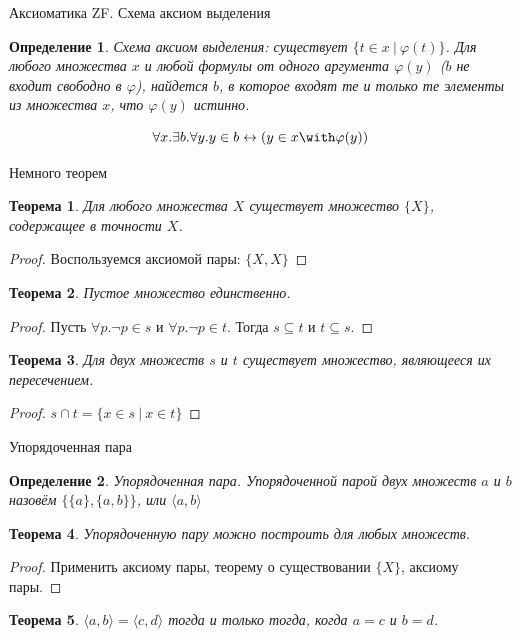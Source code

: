 \documentclass[aspectratio=169]{beamer}
\newtheorem{thm}{Теорема}[section]
\newtheorem{dfn}{Определение}[section]
\begin{document}
\begin{frame}{Аксиоматика ZF. Схема аксиом выделения}
\begin{dfn} Схема аксиом выделения: существует $\{ t \in x\ |\ \varphi(t)\}$.
Для любого множества $x$ и любой формулы от одного аргумента $\varphi(y)$
($b$ не входит свободно в $\varphi$), найдется $b$, в которое
входят те и только те элементы из множества $x$, что $\varphi(y)$ истинно.

$$\forall x.\exists b.\forall y.y \in b \leftrightarrow (y \in x \with \varphi(y))$$
\end{dfn}
\end{frame}

\begin{frame}{Немного теорем}
\begin{thm}Для любого множества $X$ существует множество $\{X\}$, содержащее в точности $X$.\end{thm}\pause
\begin{proof}Воспользуемся аксиомой пары: $\{X,X\}$\end{proof}\pause
\begin{thm}Пустое множество единственно.\end{thm}\pause
\begin{proof}Пусть $\forall p.\neg p \in s$ и $\forall p.\neg p \in t$.
Тогда $s \subseteq t$ и $t \subseteq s$.\end{proof}\pause
\begin{thm}Для двух множеств $s$ и $t$ существует множество, являющееся их пересечением.\end{thm}\pause
\begin{proof}$s \cap t = \{ x\in s\ |\ x \in t\}$\end{proof}
\end{frame}

\begin{frame}{Упорядоченная пара}
\begin{dfn}{Упорядоченная пара.}
Упорядоченной парой двух множеств $a$ и $b$ назовём
$\{\{a\},\{a,b\}\}$, или $\langle{}a,b\rangle$
\end{dfn}

\begin{thm}
Упорядоченную пару можно построить для любых множеств.
\end{thm}
\begin{proof}Применить аксиому пары, теорему о существовании $\{X\}$, аксиому пары.\end{proof}

\begin{thm}
$\langle{}a,b\rangle = \langle{}c,d\rangle$ тогда и только тогда,
когда $a = c$ и $b = d$.
\end{thm}
\end{frame}
\end{document}

